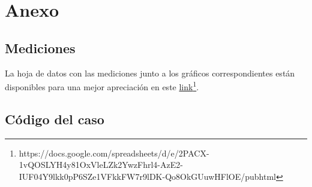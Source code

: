 \documentclass{article}
\begin{document}
\newpage
\section{Anexo}
\subsection{Mediciones}
La hoja de datos con las mediciones junto a los gráficos correspondientes están disponibles para una mejor apreciación en este \href{https://docs.google.com/spreadsheets/d/e/2PACX-1vQOSLYH4y81OxVleLZk2YwzFhrl4-AzE2-IUF04Y9lkk0pP6SZe1VFkkFW7r9lDK-Qo8OkGUuwHFlOE/pubhtml}{link}\footnote{https://docs.google.com/spreadsheets/d/e/2PACX-1vQOSLYH4y81OxVleLZk2YwzFhrl4-AzE2-IUF04Y9lkk0pP6SZe1VFkkFW7r9lDK-Qo8OkGUuwHFlOE/pubhtml}. 
\subsection{Código del caso}


















\end{document}
